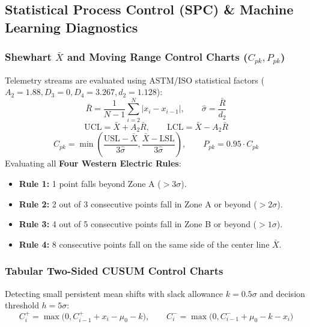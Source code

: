 \documentclass[11pt]{article}
\begin{document}
\subsection{Statistical Process Control (SPC) \& Machine Learning Diagnostics}

\subsubsection{Shewhart $\bar{X}$ and Moving Range Control Charts ($C_{pk}, P_{pk}$)}

Telemetry streams are evaluated using ASTM/ISO statistical factors ($A_2 = 1.88, D_3 = 0, D_4 = 3.267, d_2 = 1.128$):
\begin{equation}
\bar{R} = \frac{1}{N-1}\sum_{i=2}^{N} |x_i - x_{i-1}|, \qquad \hat{\sigma} = \frac{\bar{R}}{d_2}
\end{equation}
\begin{equation}
\text{UCL} = \bar{X} + A_2 \bar{R}, \qquad \text{LCL} = \bar{X} - A_2 \bar{R}
\end{equation}
\begin{equation}
C_{pk} = \min\left(\frac{\text{USL} - \bar{X}}{3\hat{\sigma}}, \frac{\bar{X} - \text{LSL}}{3\hat{\sigma}}\right), \qquad P_{pk} = 0.95 \cdot C_{pk}
\end{equation}
Evaluating all \textbf{Four Western Electric Rules}:
\begin{itemize}[leftmargin=1.2cm]
  \item \textbf{Rule 1:} 1 point falls beyond Zone A ($> 3\sigma$).
  \item \textbf{Rule 2:} 2 out of 3 consecutive points fall in Zone A or beyond ($> 2\sigma$).
  \item \textbf{Rule 3:} 4 out of 5 consecutive points fall in Zone B or beyond ($> 1\sigma$).
  \item \textbf{Rule 4:} 8 consecutive points fall on the same side of the center line $\bar{X}$.
\end{itemize}

\subsubsection{Tabular Two-Sided CUSUM Control Charts}

Detecting small persistent mean shifts with slack allowance $k = 0.5\sigma$ and decision threshold $h = 5\sigma$:
\begin{equation}
C_i^+ = \max\big(0, C_{i-1}^+ + x_i - \mu_0 - k\big), \qquad C_i^- = \max\big(0, C_{i-1}^- + \mu_0 - k - x_i\big)
\end{equation}
\end{document}
